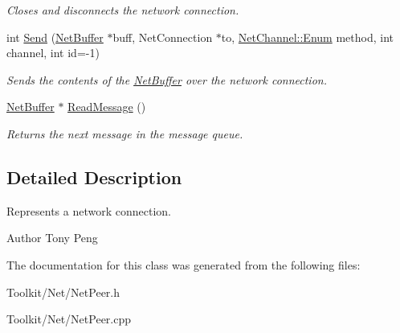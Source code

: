 \begin{DoxyCompactItemize}
\begin{DoxyCompactList}\small\item\em Closes and disconnects the network connection. \end{DoxyCompactList}\item 
\hypertarget{class_rhesus_1_1_toolkit_1_1_net_1_1_net_peer_a447aae01b13ac8f36b58da91e5ef8a73}{int \hyperlink{class_rhesus_1_1_toolkit_1_1_net_1_1_net_peer_a447aae01b13ac8f36b58da91e5ef8a73}{Send} (\hyperlink{class_rhesus_1_1_toolkit_1_1_net_1_1_net_buffer}{Net\-Buffer} $\ast$buff, Net\-Connection $\ast$to, \hyperlink{namespace_rhesus_1_1_toolkit_1_1_net_1_1_net_channel_acf0293f3b2ad1085b27f1d7feff35033}{Net\-Channel\-::\-Enum} method, int channel, int id=-\/1)}\label{class_rhesus_1_1_toolkit_1_1_net_1_1_net_peer_a447aae01b13ac8f36b58da91e5ef8a73}

\begin{DoxyCompactList}\small\item\em Sends the contents of the \hyperlink{class_rhesus_1_1_toolkit_1_1_net_1_1_net_buffer}{Net\-Buffer} over the network connection. \end{DoxyCompactList}\item 
\hypertarget{class_rhesus_1_1_toolkit_1_1_net_1_1_net_peer_a8f31d58519d76063596f3a7aafde0ba1}{\hyperlink{class_rhesus_1_1_toolkit_1_1_net_1_1_net_buffer}{Net\-Buffer} $\ast$ \hyperlink{class_rhesus_1_1_toolkit_1_1_net_1_1_net_peer_a8f31d58519d76063596f3a7aafde0ba1}{Read\-Message} ()}\label{class_rhesus_1_1_toolkit_1_1_net_1_1_net_peer_a8f31d58519d76063596f3a7aafde0ba1}

\begin{DoxyCompactList}\small\item\em Returns the next message in the message queue. \end{DoxyCompactList}\end{DoxyCompactItemize}


\subsection{Detailed Description}
Represents a network connection. 

\begin{DoxyAuthor}{Author}
Tony Peng 
\end{DoxyAuthor}


The documentation for this class was generated from the following files\-:\begin{DoxyCompactItemize}
\item 
Toolkit/\-Net/Net\-Peer.\-h\item 
Toolkit/\-Net/Net\-Peer.\-cpp\end{DoxyCompactItemize}
